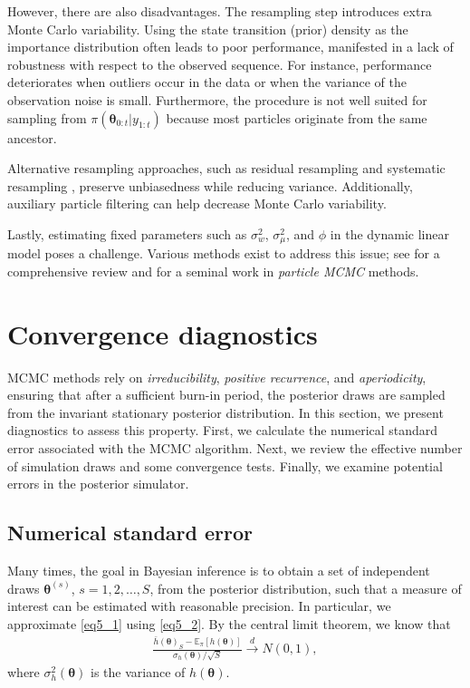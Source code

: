 However, there are also disadvantages. The resampling step introduces extra Monte Carlo variability. Using the state transition (prior) density as the importance distribution often leads to poor performance, manifested in a lack of robustness with respect to the observed sequence. For instance, performance deteriorates when outliers occur in the data or when the variance of the observation noise is small. Furthermore, the procedure is not well suited for sampling from $\pi(\bm{\theta}_{0:t}|y_{1:t})$ because most particles originate from the same ancestor.

Alternative resampling approaches, such as residual resampling \cite{Liu1995} and systematic resampling \cite{Carpenter1999}, preserve unbiasedness while reducing variance. Additionally, auxiliary particle filtering \cite{Cappe2007} can help decrease Monte Carlo variability.

Lastly, estimating fixed parameters such as $\sigma_w^2$, $\sigma_{\mu}^2$, and $\phi$ in the dynamic linear model poses a challenge. Various methods exist to address this issue; see \cite{Kantas2009,kantas2015particle} for a comprehensive review and \cite{Andrieu2010} for a seminal work in \textit{particle MCMC} methods.

\section{Convergence diagnostics}\label{sec54}
MCMC methods rely on \textit{irreducibility}, \textit{positive recurrence}, and \textit{aperiodicity}, ensuring that after a sufficient burn-in period, the posterior draws are sampled from the invariant stationary posterior distribution. In this section, we present diagnostics to assess this property. First, we calculate the numerical standard error associated with the MCMC algorithm. Next, we review the effective number of simulation draws and some convergence tests. Finally, we examine potential errors in the posterior simulator.

\subsection{Numerical standard error}
Many times, the goal in Bayesian inference is to obtain a set of independent draws $\bm{\theta}^{(s)}$, $s = 1, 2, \dots, S$, from the posterior distribution, such that a measure of interest can be estimated with reasonable precision. In particular, we approximate \eqref{eq5_1} using \eqref{eq5_2}. By the central limit theorem, we know that
\begin{align}\label{eq_CLT}
	\frac{\bar{h}(\bm{\theta})_S - \mathbb{E}_{\pi}[h(\bm{\theta})]}{\sigma_h(\bm{\theta})/\sqrt{S}} \stackrel{d}{\rightarrow} N(0, 1),
\end{align}
where $\sigma^2_h(\bm{\theta})$ is the variance of $h(\bm{\theta})$.

